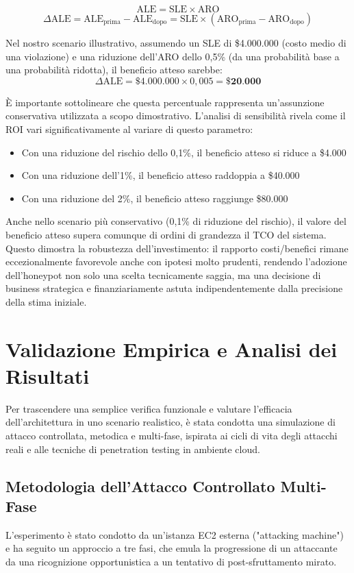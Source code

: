 \[
\text{ALE} = \text{SLE} \times \text{ARO}
\]
\[
\Delta\text{ALE} = \text{ALE}_{\text{prima}} - \text{ALE}_{\text{dopo}} = \text{SLE} \times (\text{ARO}_{\text{prima}} - \text{ARO}_{\text{dopo}})
\]

Nel nostro scenario illustrativo, assumendo un SLE di \$4.000.000 (costo medio di una violazione) e una riduzione dell'ARO dello 0,5\% (da una probabilità base a una probabilità ridotta), il beneficio atteso sarebbe:
\[
\Delta\text{ALE} = \$4.000.000 \times 0,005 = \textbf{\$20.000}
\]

È importante sottolineare che questa percentuale rappresenta un'assunzione conservativa utilizzata a scopo dimostrativo. L'analisi di sensibilità rivela come il ROI vari significativamente al variare di questo parametro:
\begin{itemize}
    \item Con una riduzione del rischio dello 0,1\%, il beneficio atteso si riduce a \$4.000
    \item Con una riduzione dell'1\%, il beneficio atteso raddoppia a \$40.000
    \item Con una riduzione del 2\%, il beneficio atteso raggiunge \$80.000
\end{itemize}

Anche nello scenario più conservativo (0,1\% di riduzione del rischio), il valore del beneficio atteso supera comunque di ordini di grandezza il TCO del sistema. Questo dimostra la robustezza dell'investimento: il rapporto costi/benefici rimane eccezionalmente favorevole anche con ipotesi molto prudenti, rendendo l'adozione dell'honeypot non solo una scelta tecnicamente saggia, ma una decisione di business strategica e finanziariamente astuta indipendentemente dalla precisione della stima iniziale.
\section{Validazione Empirica e Analisi dei Risultati}
\label{sec:validazione_empirica_analisi}

Per trascendere una semplice verifica funzionale e valutare l'efficacia dell'architettura in uno scenario realistico, è stata condotta una simulazione di attacco controllata, metodica e multi-fase, ispirata ai cicli di vita degli attacchi reali e alle tecniche di penetration testing in ambiente cloud.

\subsection{Metodologia dell'Attacco Controllato Multi-Fase}
L'esperimento è stato condotto da un'istanza EC2 esterna ("attacking machine") e ha seguito un approccio a tre fasi, che emula la progressione di un attaccante da una ricognizione opportunistica a un tentativo di post-sfruttamento mirato.

